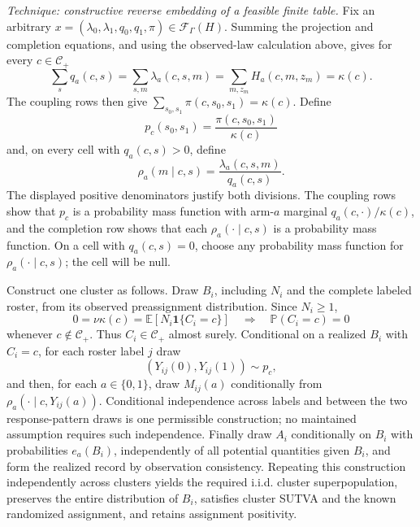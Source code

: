 \emph{Technique: constructive reverse embedding of a feasible finite table.}
Fix an arbitrary \(x=(\lambda_0,\lambda_1,q_0,q_1,\pi)\in\mathcal F_{\Gamma}(H)\).  Summing the projection and completion equations, and using the observed-law calculation above, gives for every \(c\in\mathcal C_+\)
\[
\sum_s q_a(c,s)
=\sum_{s,m}\lambda_a(c,s,m)
=\sum_{m,z_m}H_a(c,m,z_m)
=\kappa(c).
\]
The coupling rows then give \(\sum_{s_0,s_1}\pi(c,s_0,s_1)=\kappa(c)\).  Define
\[
p_c(s_0,s_1)=\frac{\pi(c,s_0,s_1)}{\kappa(c)}
\]
and, on every cell with \(q_a(c,s)>0\), define
\[
\rho_a(m\mid c,s)=\frac{\lambda_a(c,s,m)}{q_a(c,s)}.
\]
The displayed positive denominators justify both divisions.  The coupling rows show that \(p_c\) is a probability mass function with arm-\(a\) marginal \(q_a(c,\cdot)/\kappa(c)\), and the completion row shows that each \(\rho_a(\cdot\mid c,s)\) is a probability mass function.  On a cell with \(q_a(c,s)=0\), choose any probability mass function for \(\rho_a(\cdot\mid c,s)\); the cell will be null.

Construct one cluster as follows.  Draw \(B_i\), including \(N_i\) and the complete labeled roster, from its observed preassignment distribution.  Since \(N_i\geq1\),
\[
0=\nu\kappa(c)=\mathbb E[N_i\mathbf 1\{C_i=c\}]
\quad\Longrightarrow\quad
\mathbb P(C_i=c)=0
\]
whenever \(c\notin\mathcal C_+\).  Thus \(C_i\in\mathcal C_+\) almost surely.  Conditional on a realized \(B_i\) with \(C_i=c\), for each roster label \(j\) draw
\[
(Y_{ij}(0),Y_{ij}(1))\sim p_c,
\]
and then, for each \(a\in\{0,1\}\), draw \(M_{ij}(a)\) conditionally from \(\rho_a(\cdot\mid c,Y_{ij}(a))\).  Conditional independence across labels and between the two response-pattern draws is one permissible construction; no maintained assumption requires such independence.  Finally draw \(A_i\) conditionally on \(B_i\) with probabilities \(e_a(B_i)\), independently of all potential quantities given \(B_i\), and form the realized record by observation consistency.  Repeating this construction independently across clusters yields the required i.i.d. cluster superpopulation, preserves the entire distribution of \(B_i\), satisfies cluster SUTVA and the known randomized assignment, and retains assignment positivity.

